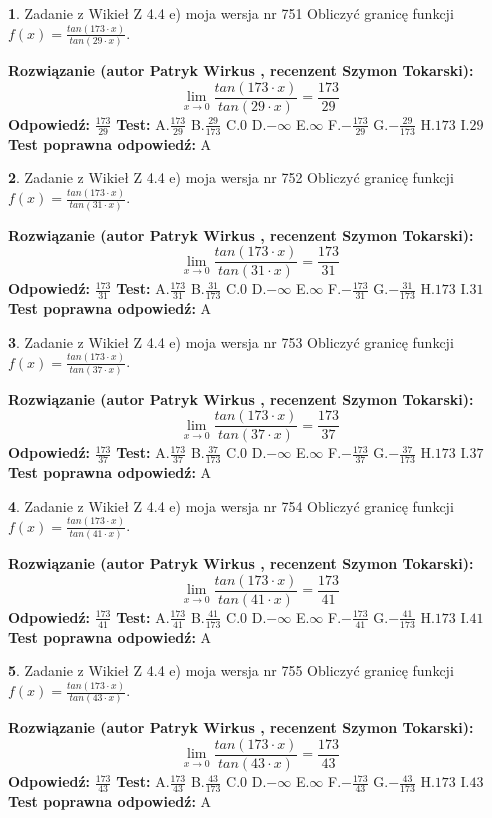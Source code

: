 \documentclass[12pt, a4paper]{article}
\theoremstyle{definition} %
\newtheorem{zad}{}
\newcommand{\zadStart}[1]{\begin{zad}#1\newline}
\newcommand{\zadStop}{\end{zad}}
\newcommand{\rozwStart}[2]{\noindent \textbf{Rozwiązanie (autor #1 , recenzent #2): }\newline}
\newcommand{\rozwStop}{\newline}
\newcommand{\odpStart}{\noindent \textbf{Odpowiedź:}\newline}
\newcommand{\odpStop}{\newline}
\newcommand{\testStart}{\noindent \textbf{Test:}\newline}
\newcommand{\testStop}{\newline}
\newcommand{\kluczStart}{\noindent \textbf{Test poprawna odpowiedź:}\newline}
\newcommand{\kluczStop}{\newline}
\begin{document}
\zadStart{Zadanie z Wikieł Z 4.4 e) moja wersja nr 751}
Obliczyć granicę funkcji $f(x)=\frac{tan(173\cdot x)}{tan(29\cdot x)}$.
\zadStop
\rozwStart{Patryk Wirkus}{Szymon Tokarski}
$$\lim\limits_{x\to 0}\frac{tan(173\cdot x)}{tan(29\cdot x)}=
\frac{173}{29}$$
\rozwStop
\odpStart
$\frac{173}{29}$
\odpStop
\testStart
A.$\frac{173}{29}$
B.$\frac{29}{173}$
C.$0$
D.$-\infty$
E.$\infty$
F.$-\frac{173}{29}$
G.$-\frac{29}{173}$
H.$173$
I.$29$
\testStop
\kluczStart
A
\kluczStop



\zadStart{Zadanie z Wikieł Z 4.4 e) moja wersja nr 752}
Obliczyć granicę funkcji $f(x)=\frac{tan(173\cdot x)}{tan(31\cdot x)}$.
\zadStop
\rozwStart{Patryk Wirkus}{Szymon Tokarski}
$$\lim\limits_{x\to 0}\frac{tan(173\cdot x)}{tan(31\cdot x)}=
\frac{173}{31}$$
\rozwStop
\odpStart
$\frac{173}{31}$
\odpStop
\testStart
A.$\frac{173}{31}$
B.$\frac{31}{173}$
C.$0$
D.$-\infty$
E.$\infty$
F.$-\frac{173}{31}$
G.$-\frac{31}{173}$
H.$173$
I.$31$
\testStop
\kluczStart
A
\kluczStop



\zadStart{Zadanie z Wikieł Z 4.4 e) moja wersja nr 753}
Obliczyć granicę funkcji $f(x)=\frac{tan(173\cdot x)}{tan(37\cdot x)}$.
\zadStop
\rozwStart{Patryk Wirkus}{Szymon Tokarski}
$$\lim\limits_{x\to 0}\frac{tan(173\cdot x)}{tan(37\cdot x)}=
\frac{173}{37}$$
\rozwStop
\odpStart
$\frac{173}{37}$
\odpStop
\testStart
A.$\frac{173}{37}$
B.$\frac{37}{173}$
C.$0$
D.$-\infty$
E.$\infty$
F.$-\frac{173}{37}$
G.$-\frac{37}{173}$
H.$173$
I.$37$
\testStop
\kluczStart
A
\kluczStop



\zadStart{Zadanie z Wikieł Z 4.4 e) moja wersja nr 754}
Obliczyć granicę funkcji $f(x)=\frac{tan(173\cdot x)}{tan(41\cdot x)}$.
\zadStop
\rozwStart{Patryk Wirkus}{Szymon Tokarski}
$$\lim\limits_{x\to 0}\frac{tan(173\cdot x)}{tan(41\cdot x)}=
\frac{173}{41}$$
\rozwStop
\odpStart
$\frac{173}{41}$
\odpStop
\testStart
A.$\frac{173}{41}$
B.$\frac{41}{173}$
C.$0$
D.$-\infty$
E.$\infty$
F.$-\frac{173}{41}$
G.$-\frac{41}{173}$
H.$173$
I.$41$
\testStop
\kluczStart
A
\kluczStop



\zadStart{Zadanie z Wikieł Z 4.4 e) moja wersja nr 755}
Obliczyć granicę funkcji $f(x)=\frac{tan(173\cdot x)}{tan(43\cdot x)}$.
\zadStop
\rozwStart{Patryk Wirkus}{Szymon Tokarski}
$$\lim\limits_{x\to 0}\frac{tan(173\cdot x)}{tan(43\cdot x)}=
\frac{173}{43}$$
\rozwStop
\odpStart
$\frac{173}{43}$
\odpStop
\testStart
A.$\frac{173}{43}$
B.$\frac{43}{173}$
C.$0$
D.$-\infty$
E.$\infty$
F.$-\frac{173}{43}$
G.$-\frac{43}{173}$
H.$173$
I.$43$
\testStop
\kluczStart
A
\kluczStop
\end{document}
